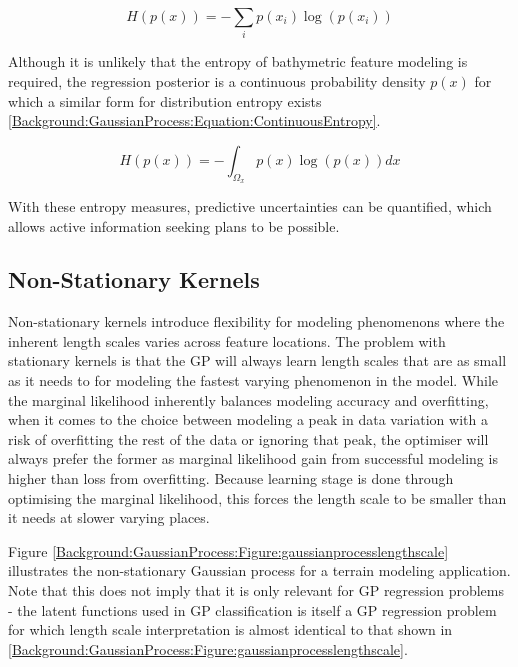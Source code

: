 				\begin{equation}
					H(p(x)) = - \sum_{i} p(x_{i}) \log(p(x_{i}))
				\label{Background:GaussianProcess:Equation:DiscreteEntropy}
				\end{equation}
				
				Although it is unlikely that the entropy of bathymetric feature modeling is required, the regression posterior is a continuous probability density $p(x)$ for which a similar form for distribution entropy exists \eqref{Background:GaussianProcess:Equation:ContinuousEntropy}.
				
				\begin{equation}
					H(p(x)) = - \int_{\Omega_{x}} p(x) \log(p(x)) dx
				\label{Background:GaussianProcess:Equation:ContinuousEntropy}
				\end{equation}
								
				With these entropy measures, predictive uncertainties can be quantified, which allows active information seeking plans to be possible.
				
		\subsection{Non-Stationary Kernels}
			
			Non-stationary kernels introduce flexibility for modeling phenomenons where the inherent length scales varies across feature locations. The problem with stationary kernels is that the GP will always learn length scales that are as small as it needs to for modeling the fastest varying phenomenon in the model. While the marginal likelihood inherently balances modeling accuracy and overfitting, when it comes to the choice between modeling a peak in data variation with a risk of overfitting the rest of the data or ignoring that peak, the optimiser will always prefer the former as marginal likelihood gain from successful modeling is higher than loss from overfitting. Because learning stage is done through optimising the marginal likelihood, this forces the length scale to be smaller than it needs at slower varying places.

			Figure \ref{Background:GaussianProcess:Figure:gaussianprocesslengthscale} illustrates the non-stationary Gaussian process for a terrain modeling application. Note that this does not imply that it is only relevant for GP regression problems - the latent functions used in GP classification is itself a GP regression problem for which length scale interpretation is almost identical to that shown in \cref{Background:GaussianProcess:Figure:gaussianprocesslengthscale}.
			
